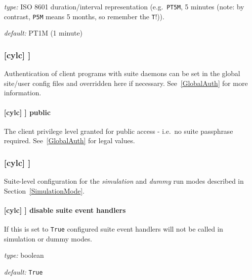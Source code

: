 \begin{myitemize}
    \item {\em type:} ISO 8601 duration/interval representation (e.g.\ 
 \lstinline=PT5M=, 5 minutes (note: by contrast, \lstinline=P5M= means 5
 months, so remember the \lstinline=T=!)).
    \item {\em default:} PT1M (1 minute)
\end{myitemize}

\subsubsection[{[[}authentication{]]}]{[cylc] \textrightarrow [[authentication]] }
\label{SuiteAuth}

Authentication of client programs with suite daemons can be set in the
global site/user config files and overridden here if necessary.
See~\ref{GlobalAuth} for more information.

\paragraph[public]{[cylc] \textrightarrow [[authentication]] \textrightarrow public}

The client privilege level granted for public access - i.e.\ no suite passphrase
required.  See~\ref{GlobalAuth} for legal values.

\subsubsection[{[[}simulation{]]} ]{[cylc] \textrightarrow [[simulation]]}

Suite-level configuration for the {\em simulation} and {\em dummy} run modes
described in Section~\ref{SimulationMode}.

\paragraph[disable suite event handlers]{[cylc] \textrightarrow [[simulation]] \textrightarrow disable suite event handlers}

If this is set to \lstinline=True= configured suite event handlers will not be
called in simulation or dummy modes.

\begin{myitemize}
    \item {\em type:} boolean
    \item {\em default:} \lstinline=True=
\end{myitemize}


